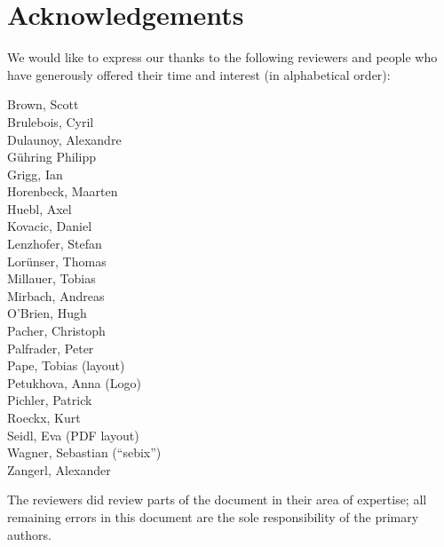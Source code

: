 \newpage
\section*{Acknowledgements}
\label{section:Reviewers}

We would like to express our thanks to the following reviewers and people who have generously offered their time and interest (in alphabetical order):

\begin{multicols}{2}{\parskip=0pt\centering\obeylines%
Brown, Scott \\
Brulebois, Cyril \\
Dulaunoy, Alexandre \\
G\"uhring Philipp  \\
Grigg, Ian  \\
Horenbeck, Maarten \\
Huebl, Axel \\
Kovacic, Daniel \\
Lenzhofer, Stefan \\
Lor\"unser, Thomas \\
Millauer, Tobias \\
Mirbach, Andreas \\
O'Brien, Hugh \\
Pacher, Christoph \\
Palfrader, Peter \\
Pape, Tobias (layout) \\
Petukhova, Anna (Logo) \\
Pichler, Patrick \\
Roeckx, Kurt \\
Seidl, Eva (PDF layout) \\
Wagner, Sebastian (``sebix'') \\
Zangerl, Alexander \\
}\end{multicols}





The reviewers did review parts of the document in their area of
expertise; all remaining errors in this document are the sole
responsibility of the primary authors.





